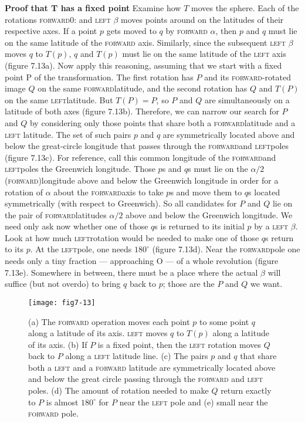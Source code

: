 \documentclass{book}
\begin{document}
\textbf{Proof that T has a fixed point} Examine how $T$ moves the sphere. Each
of the rotations \textsc{forward}0: and \textsc{left} $\beta$ moves points around on the
latitudes of their respective axes. If a point $p$ gets moved to $q$ by
\textsc{forward} $\alpha$, then $p$ and $q$ must lie on the same latitude of the \textsc{forward}
axis. Similarly, since the subsequent \textsc{left} $\beta$ moves $q$ to $T(p)$, $q$ and
$T(p)$ must lie on the same latitude of the \textsc{left} axis (figure 7.13a). Now
apply this reasoning, assuming that we start with a fixed point P of
the transformation. The first rotation has $P$ and its \textsc{forward}-rotated
image $Q$ on the same \textsc{forward}latitude, and the second rotation has $Q$
and $T(P)$ on the same \textsc{left}latitude. But $T(P) = P$, so $P$ and $Q$ are
simultaneously on a latitude of both axes (figure 7.13b). Therefore, we
can narrow our search for $P$ and $Q$ by considering only those points
that share both a \textsc{forward}latitude and a \textsc{left} latitude. The set of
such pairs $p$ and $q$ are symmetrically located above and below the great-circle longitude that passes through the \textsc{forward}and \textsc{left}poles (figure
7.13c). For reference, call this common longitude of the \textsc{forward}and
\textsc{left}poles the Greenwich longitude. Those $p$s and $q$s must lie on the
$\alpha / 2$ (\textsc{forward})longitude above and below the Greenwich longitude in
order for a rotation of $\alpha$ about the \textsc{forward}axis to take $p$s and move
them to $q$s located symmetrically (with respect to Greenwich). So all
candidates for $P$ and $Q$ lie on the pair of \textsc{forward}latitudes $\alpha / 2$ above
and below the Greenwich longitude. We need only ask now whether one
of those $q$s is returned to its initial $p$ by a \textsc{left} $\beta$. Look at how much
\textsc{left}rotation would be needed to make one of those $q$s return to its $p$.
At the \textsc{left}pole, one needs $180^{\circ}$ (figure 7.13d). Near the \textsc{forward}pole
one needs only a tiny fraction --- approaching O --- of a whole revolution
(figure 7.13e). Somewhere in between, there must be a place where the
actual $\beta$ will suffice (but not overdo) to bring $q$ back to $p$; those are the
$P$ and $Q$ we want.

\begin{figure}
\begin{center}
\texttt{[image: fig7-13]}
\caption{(a) The \textsc{forward} operation moves each point $p$ to some point $q$ along a latitude of its axis. \textsc{left} moves $q$ to $T(p)$ along a latitude of its axis. (b) If $P$ is a fixed point, then the \textsc{left} rotation moves $Q$ back to $P$ along a \textsc{left} latitude line. (c) The pairs $p$ and $q$ that share both a \textsc{left} and a \textsc{forward} latitude are symmetrically located above and below the great circle passing through the \textsc{forward} and \textsc{left} poles. (d) The amount of rotation needed to make $Q$ return exactly to $P$ is almost $180^{\circ}$ for $P$ near the \textsc{left} pole and (e) small near the \textsc{forward} pole.
}
\end{center}
\end{figure}
\end{document}
